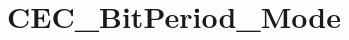 \hypertarget{group___c_e_c___bit_period___mode}{\section{C\-E\-C\-\_\-\-Bit\-Period\-\_\-\-Mode}
\label{group___c_e_c___bit_period___mode}
}
